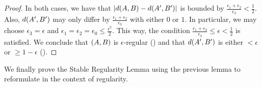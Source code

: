 \begin{lemma}[Lemma 5.17]
\begin{proof}
                In both cases, we have that $| d ( A,B ) - d ( A',B' ) |$ is bounded by
                $\frac{\epsilon_1 + \epsilon_2}{\epsilon_3} < \frac{1}{2}$.
                Also, $d ( A', B' )$ may only differ by $\frac{\epsilon_1 + \epsilon_2}{\epsilon_3}$ with either
                $0$ or $1$.
                In particular, we may choose $\epsilon_3 = \epsilon$ and $\epsilon_1 = \epsilon_2 = \epsilon_0 \leq \frac{\epsilon^2}{2}$.
                This way, the condition $\frac{\epsilon_1 + \epsilon_2}{\epsilon_3} \leq \epsilon < \frac{1}{2}$ is satisfied.
                We conclude that $( A,B )$ is $\epsilon$-regular () and that $d ( A',B' )$ is either
                $< \epsilon$ or $\geq 1 - \epsilon$ ().
            \end{proof}
        \end{lemma}

        We finally prove the Stable Regularity Lemma using the previous lemma to reformulate
         in the context of regularity.

